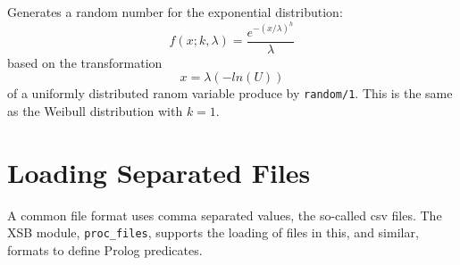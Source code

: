 \begin{description}
 
%
Generates a random number for the exponential distribution:
\[
  f(x;k,\lambda) = \frac{e^{-(x/\lambda)^h}}{\lambda}
\]
based on the transformation
\[
  x = \lambda(-ln(U))
\]
of a uniformly distributed ranom variable produce by {\tt random/1}.
This is the same as the Weibull distribution with $k = 1$.

\end{description}

\section{Loading Separated Files}

A common file format uses comma separated values, the so-called csv
files.  The XSB module, {\tt proc\_files}, supports the loading of
files in this, and similar, formats to define Prolog predicates.

